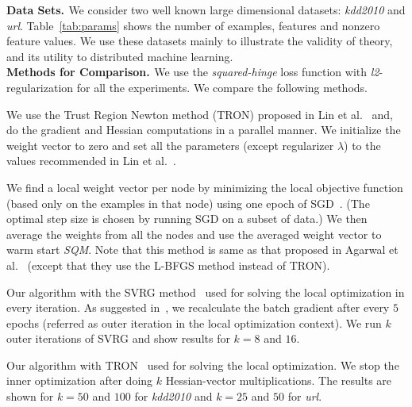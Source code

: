 {\bf{Data Sets. }}We consider two well known large dimensional datasets: {\it{kdd2010}}  and {\it{url}}. Table~\ref{tab:params} shows the number of examples, features and nonzero feature values. We use these datasets mainly to illustrate the validity of theory, and its utility to distributed machine learning.\vspace{0.1in} \\
{\bf{Methods for Comparison. }}We use the {\it{squared-hinge}} loss function with {\it{l2}}-regularization for all the experiments. We compare the following methods.

We use the Trust Region Newton method (TRON) proposed in Lin et al.~ and, do the gradient and Hessian computations in a parallel manner. We initialize the weight vector to zero and set all the parameters (except regularizer $\lambda$) to the values recommended in Lin et al.~.

We find a local weight vector per node by minimizing the local objective function (based only on the examples in that node) using one epoch of SGD~\cite{bottou2010}. (The optimal step size is chosen by running SGD on a subset of data.) We then average the weights from all the nodes and use the averaged weight vector to warm start {\it{SQM}}. Note that this method is same as that proposed in Agarwal et al.~ (except that they use the L-BFGS method instead of TRON).

Our algorithm with the SVRG method~\cite{johnson2013} used for solving the local optimization in every iteration. As suggested in~\cite{johnson2013}, we recalculate the batch gradient after every $5$ epochs (referred as outer iteration in the local optimization context). We run $k$ outer iterations of SVRG and show results for $k=8$ and $16$.

Our algorithm with TRON~\cite{lin2008} used for solving the local optimization. We stop the inner optimization after doing $k$ Hessian-vector multiplications. The results are shown for $k=50$ and $100$ for {\it{kdd2010}} and $k=25$ and $50$ for {\it{url}}.


